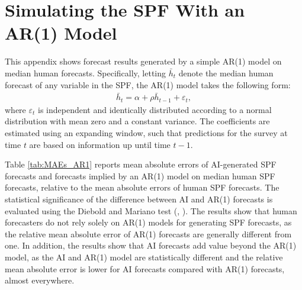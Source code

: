 \documentclass[11pt,letterpaper]{scrartcl}
\begin{document}
\clearpage
\section{Simulating the SPF With an AR(1) Model}\label{app:AR1}

This appendix shows forecast results generated by a simple AR(1) model on median human forecasts. Specifically, letting $\bar h_t$ denote the median human forecast of any variable in the SPF, the AR(1) model takes the following form:
\begin{align}
    \bar h_t = \alpha + \rho \bar h_{t-1}   + \varepsilon_t,
\end{align}
where $\varepsilon_t$ is independent and identically distributed according to a normal distribution with mean zero and a constant variance. The coefficients are estimated using an expanding window, such that predictions for the survey at time $t$ are based on information up until time $t-1$. 

Table \ref{tab:MAEs_AR1} reports mean absolute errors of AI-generated SPF forecasts and forecasts implied by an AR(1) model on median human SPF forecasts, relative to the mean absolute errors of human SPF forecasts. The statistical significance of the difference between AI and AR(1) forecasts is evaluated using the Diebold and Mariano test (\cite{diebold1995comparing}, \cite{diebold1997evaluating}). The results show that human forecasters do not rely solely on AR(1) models for generating SPF forecasts, as the relative mean absolute error of AR(1) forecasts are generally different from one. In addition, the results show that AI forecasts add value beyond the AR(1) model, as the AI and AR(1) model are statistically different and the relative mean absolute error is lower for AI forecasts compared with AR(1) forecasts, almost everywhere. 
\end{document}
